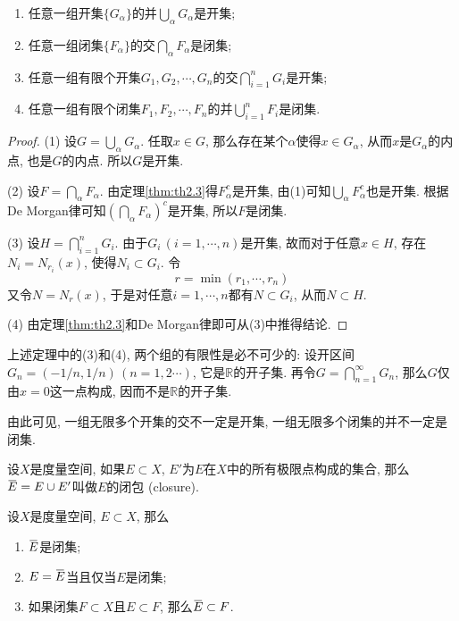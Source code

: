 \documentclass[cn,12pt,math=mtpro2,citestyle=gb7714-2015,bibstyle=gb7714-2015,twocol]{elegantbook}
\newcommand{\R}{\mathbb{R}}
\newcommand{\overbar}[1]{\mkern 1.5mu\overline{\mkern-1.5mu#1\mkern-1.5mu}\mkern 1.5mu}
\begin{document}
\begin{theorem}\label{thm:th2.13}
\begin{enumerate}[label=(\arabic*)]
  \item 任意一组开集$\{G_\alpha\}$的并$\bigcup_\alpha G_\alpha$是开集;

  \item 任意一组闭集$\{F_\alpha\}$的交$\bigcap_\alpha F_\alpha$是闭集;

  \item 任意一组有限个开集$G_1, G_2,\cdots, G_n$的交$\bigcap_{i=1}^nG_i$是开集;

  \item 任意一组有限个闭集$F_1, F_2,\cdots, F_n$的并$\bigcup_{i=1}^nF_i$是闭集.
\end{enumerate}
\end{theorem}
\begin{proof}
  (1) 设$G=\bigcup_\alpha G_\alpha$. 任取$x\in G$, 那么存在某个$\alpha$使得$x\in G_\alpha$, 从而$x$是$G_\alpha$的内点, 也是$G$的内点. 所以$G$是开集.

  (2) 设$F= \bigcap_\alpha F_\alpha$. 由定理\ref{thm:th2.3}得$F_\alpha^c$是开集, 由(1)可知$\bigcup_\alpha F_\alpha^c$也是开集. 根据De Morgan律可知$\left(\bigcap_\alpha F_\alpha\right)^c$是开集, 所以$F$是闭集.

  (3) 设$H=\bigcap_{i=1}^nG_i$. 由于$G_i\, (i=1,\cdots,n)$是开集, 故而对于任意$x\in H$, 存在$N_i=N_{r_i}(x)$, 使得$N_i\subset G_i$. 令
  $$r=\min(r_1,\cdots,r_n)$$
  又令$N=N_r(x)$, 于是对任意$i=1,\cdots,n$都有$N\subset G_i$, 从而$N\subset H$.

  (4) 由定理\ref{thm:th2.3}和De Morgan律即可从(3)中推得结论.


\end{proof}
\begin{remark}
 上述定理中的(3)和(4), 两个组的有限性是必不可少的: 设开区间$G_n=(-1/n,1/n)\,(n=1,2\cdots)$, 它是$\R$的开子集. 再令$G=\bigcap_{n=1}^\infty G_n$, 那么$G$仅由$x=0$这一点构成, 因而不是$\R$的开子集.

 由此可见, 一组无限多个开集的交不一定是开集, 一组无限多个闭集的并不一定是闭集.
\end{remark}
\begin{definition}
设$X$是度量空间, 如果$E\subset X$, $E'$为$E$在$X$中的所有极限点构成的集合, 那么$\overbar{E}=E\cup E'$叫做$E$的闭包 (closure).
\end{definition}
\begin{theorem}\label{thm:th2.5}
  设$X$是度量空间, $E\subset X$, 那么
  \begin{enumerate}[label=(\arabic*)]
  \item $\overbar{E}$是闭集;

  \item $E=\overbar{E}$当且仅当$E$是闭集;

  \item 如果闭集$F\subset X$且$E\subset F$, 那么$\overbar{E}\subset F$.
  \end{enumerate}
\end{theorem}
\end{document}
